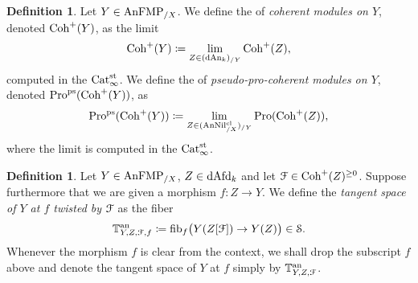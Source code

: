\documentclass[10pt,a4paper,reqno]{amsart} %
\theoremstyle{plain}
\theoremstyle{definition}
\newtheorem{defin}[thm]{Definition}
\theoremstyle{remark}
\numberwithin{equation}{section}
\begin{document}
\begin{defin}
    Let $Y \in \mathrm{AnFMP}_{/X}$. We define the \infcat of \emph{coherent modules on $Y$}, denoted $\mathrm{Coh}^+(Y)$, as the limit
        \[
            \mathrm{Coh}^+(Y) \coloneqq \lim_{Z \in (\mathrm{dAn}_k)_{/Y}}  \mathrm{Coh}^+(Z),
        \]
    computed in the \infcat $\mathrm{Cat}_{\infty}^{\mathrm{st}}$. We define the \infcat of \emph{pseudo-pro-coherent modules on $Y$}, denoted $\mathrm{Pro}^{\mathrm{ps}}(\mathrm{Coh}^+(Y))$, as
        \[
            \mathrm{Pro}^\mathrm{ps}(\mathrm{Coh}^+(Y)) \coloneqq \lim_{Z \in (\mathrm{AnNil}_{/X}^{\mathrm{cl}})_{/Y}} \mathrm{Pro}(\mathrm{Coh}^+(Z)),  
        \]
    where the limit is computed in the \infcat $\mathrm{Cat}_{\infty}^{\mathrm{st}}$.
\end{defin}

\begin{defin} Let $Y \in \mathrm{AnFMP}_{/X}$, $Z \in \mathrm{dAfd}_k$ and let $\mathcal F \in \mathrm{Coh}^+(Z)^{\ge 0}$. Suppose furthermore that we are given a morphism $f \colon Z \to Y$.
    We define the \emph{tangent space of $Y$ at $f$ twisted by $\mathcal F$} as the fiber
        \[
            \mathbb T^\mathrm{an}_{Y, Z, \mathcal F,f} \coloneqq \mathrm{fib}_f\big( Y(Z[\mathcal F]) \to Y(Z) \big) 
            \in \mathcal S.  
        \]
    Whenever the morphism $f$ is clear from the context, we shall drop the subscript $f$ above and denote the tangent space of $Y$ at $f$ simply by $\mathbb T^\mathrm{an}_{Y, Z, \mathcal F}$.
\end{defin}
\end{document}
